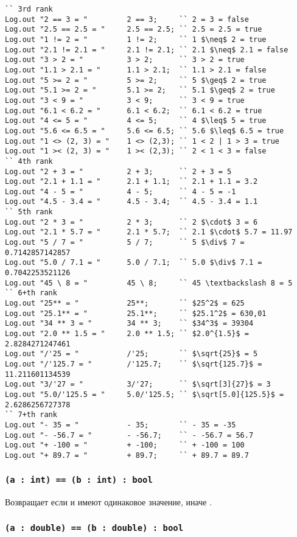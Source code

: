 \begin{lstlisting}[caption=Примеры использования операторов над данными типа int и double, label=numberopex]
`` 3rd rank
Log.out "2 == 3 = "			2 == 3;		`` 2 = 3 = false
Log.out "2.5 == 2.5 = "		2.5 == 2.5;	`` 2.5 = 2.5 = true
Log.out "1 != 2 = "			1 != 2;		`` 1 $\neq$ 2 = true
Log.out "2.1 != 2.1 = "		2.1 != 2.1;	`` 2.1 $\neq$ 2.1 = false
Log.out "3 > 2 = "			3 > 2;		`` 3 > 2 = true
Log.out "1.1 > 2.1 = "		1.1 > 2.1;	`` 1.1 > 2.1 = false
Log.out "5 >= 2 = "			5 >= 2;		`` 5 $\geq$ 2 = true
Log.out "5.1 >= 2 = "		5.1 >= 2;	`` 5.1 $\geq$ 2 = true
Log.out "3 < 9 = "			3 < 9;		`` 3 < 9 = true
Log.out "6.1 < 6.2 = "		6.1 < 6.2;	`` 6.1 < 6.2 = true
Log.out "4 <= 5 = "			4 <= 5;		`` 4 $\leq$ 5 = true
Log.out "5.6 <= 6.5 = "		5.6 <= 6.5;	`` 5.6 $\leq$ 6.5 = true
Log.out "1 <> (2, 3) = "	1 <> (2,3); `` 1 < 2 | 1 > 3 = true
Log.out "1 >< (2, 3) = "	1 >< (2,3); `` 2 < 1 < 3 = false
`` 4th rank
Log.out "2 + 3 = "			2 + 3;		`` 2 + 3 = 5
Log.out "2.1 + 1.1 = "		2.1 + 1.1;	`` 2.1 + 1.1 = 3.2
Log.out "4 - 5 = "			4 - 5;		`` 4 - 5 = -1
Log.out "4.5 - 3.4 = "		4.5 - 3.4;	`` 4.5 - 3.4 = 1.1
`` 5th rank
Log.out "2 * 3 = "			2 * 3;		`` 2 $\cdot$ 3 = 6
Log.out "2.1 * 5.7 = "		2.1 * 5.7;	`` 2.1 $\cdot$ 5.7 = 11.97
Log.out "5 / 7 = "			5 / 7;		`` 5 $\div$ 7 = 0.7142857142857
Log.out "5.0 / 7.1 = "		5.0 / 7.1;	`` 5.0 $\div$ 7.1 = 0.7042253521126
Log.out "45 \ 8 = "			45 \ 8;		`` 45 \textbackslash 8 = 5
`` 6+th rank
Log.out "25** = "			25**;		`` $25^2$ = 625
Log.out "25.1** = "			25.1**;		`` $25.1^2$ = 630,01
Log.out "34 ** 3 = "		34 ** 3;	`` $34^3$ = 39304
Log.out "2.0 ** 1.5 = "		2.0 ** 1.5;	`` $2.0^{1.5}$ = 2.8284271247461
Log.out "/'25 = "			/'25;		`` $\sqrt{25}$ = 5
Log.out "/'125.7 = "		/'125.7;	`` $\sqrt{125.7}$ = 11.211601134539
Log.out "3/'27 = "			3/'27;		`` $\sqrt[3]{27}$ = 3
Log.out "5.0/'125.5 = "		5.0/'125.5;	`` $\sqrt[5.0]{125.5}$ = 2.6286256727378
`` 7+th rank
Log.out "- 35 = "			- 35;		`` - 35 = -35
Log.out "- -56.7 = "		- -56.7;	`` - -56.7 = 56.7
Log.out "+ -100 = "			+ -100;		`` + -100 = 100
Log.out "+ 89.7 = "			+ 89.7;		`` + 89.7 = 89.7
\end{lstlisting}

\subsubsection{\lstinline|(a : int) == (b : int) : bool|}

Возвращает \true{} если  и  имеют одинаковое значение, иначе \false{}.

\subsubsection{\lstinline|(a : double) == (b : double) : bool|}

